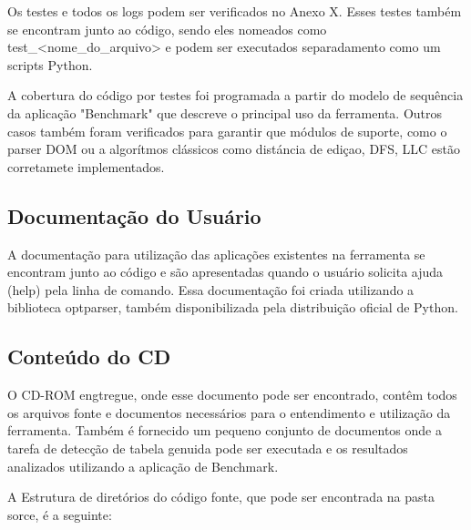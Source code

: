 \documentclass{acm_proc_article-sp}
\newcommand{\remove}[1]{}
\numberwithin{equation}{section}
\begin{document}
Os testes e todos os logs podem ser verificados no Anexo X. Esses testes
também se encontram junto ao código, sendo eles nomeados como
test\_<nome\_do\_arquivo> e podem ser executados separadamento como
um scripts Python.

A cobertura do código por testes foi programada a partir do modelo de
sequência da aplicação "Benchmark" que descreve o principal uso da
ferramenta. Outros casos também foram verificados para garantir que
módulos de suporte, como o parser DOM ou a algorítmos clássicos como
distáncia de ediçao, DFS, LLC estão corretamete
implementados.


\subsection{Documentação do Usuário}

A documentação para utilização das aplicações existentes na ferramenta
se encontram junto ao código e são apresentadas quando o usuário
solicita ajuda (help) pela linha de comando. Essa documentação foi
criada utilizando a biblioteca optparser, também disponibilizada pela
distribuição oficial de Python.

\remove{
A documentação do código foi realizada utilizando outro modelo padrão de
Python, o pydoc, e pode ser encontrada na pasta raiz do projeto em
formato HTML para facilitar a leitura e a busca por alguma
funcionalidade específica.
}

\subsection{Conteúdo do CD}

O CD-ROM engtregue, onde esse documento pode ser encontrado, contêm
todos os arquivos fonte e documentos necessários para o entendimento e
utilização da ferramenta. Também é fornecido um pequeno conjunto de
documentos onde a tarefa de detecção de tabela genuida pode ser
executada e os resultados analizados utilizando a aplicação de Benchmark.

A Estrutura de diretórios do código fonte, que pode ser encontrada na
pasta sorce, é a seguinte:
\end{document}

